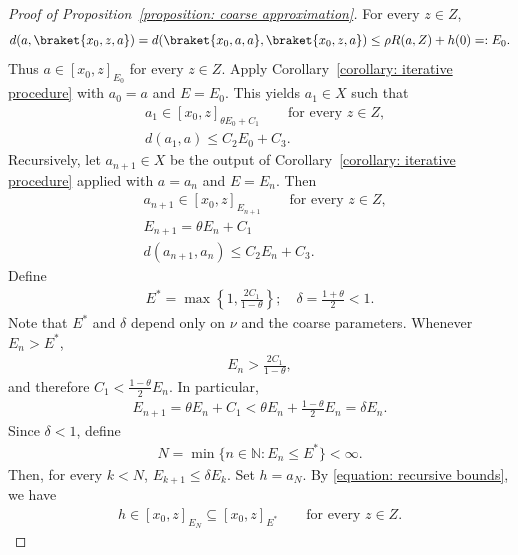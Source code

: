 \documentclass[12pt,reqno]{amsart}
\newcommand{\N}{\mathbb{N}}
\numberwithin{equation}{section}
\begin{document}
\begin{proof}[Proof of Proposition~\ref{proposition: coarse approximation}]
    For every $z\in Z$,
    \begin{align*}
        d(a,\braket{x_0,z,a})=d(\braket{x_0,a,a},\braket{x_0,z,a})\le\rho R(a,Z)+h(0)=:E_0.
    \end{align*}
    Thus $a\in[x_0,z]_{E_0}$ for every $z\in Z$.
    Apply Corollary~\ref{corollary: iterative procedure} with $a_0=a$ and $E=E_0$. This yields $a_1\in X$ such that
    \begin{align*}
        &a_1\in [x_0,z]_{\theta E_0+C_1}\qquad\text{for every }z\in Z,\\
        &d(a_1,a)\le C_2E_0+C_3.
    \end{align*}
    Recursively, let $a_{n+1}\in X$ be the output of Corollary~\ref{corollary: iterative procedure} applied with $a=a_n$ and $E=E_n$. Then
    \begin{equation}
    \label{equation: recursive bounds}
    \begin{aligned}
        &a_{n+1}\in [x_0,z]_{E_{n+1}}\qquad\text{for every }z\in Z,\\
        &E_{n+1}=\theta E_n+C_1\\
        &d(a_{n+1},a_{n})\le C_2 E_n+C_3.
    \end{aligned}      
    \end{equation}
    Define
    \begin{align*}
        E^*=\max \left\{1,\frac{2C_1}{1-\theta}\right\};\quad \delta=\frac{1+\theta}{2}<1.
    \end{align*}
    Note that $E^*$ and $\delta$ depend only on $\nu$ and the coarse parameters.
    Whenever $E_n>E^*$,
    \begin{align*}
        E_n>\frac{2C_1}{1-\theta},
    \end{align*}
    and therefore $C_1< \frac{1-\theta}{2}E_n$. In particular,
    \begin{align*}
        E_{n+1}=\theta E_n+C_1< \theta E_n+\frac{1-\theta}{2}E_n=\delta E_n.
    \end{align*}
    Since $\delta<1$, define
    \begin{align*}
        N=\min\{n\in \N: E_n \le E^*\}<\infty.
    \end{align*}
    Then, for every $k<N$, $E_{k+1}\le \delta E_k$.
    Set $h=a_N$.
    By \eqref{equation: recursive bounds}, we have
    \begin{align*}
        h\in [x_0,z]_{E_N}\subseteq [x_0,z]_{E^*}\qquad\text{for every }z\in Z.

\end{align*}
\end{proof}
\end{document}
